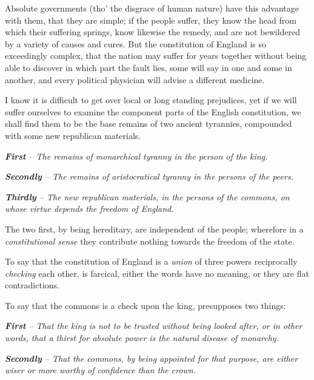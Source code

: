 \documentclass[12pt, twocolumn]{book}
\begin{document}
    Absolute governments (tho’ the disgrace of human nature) have this advantage with them, that they are simple; if the people suffer, they know the head from which their suffering springs, know likewise the remedy, and are not bewildered by a variety of causes and cures. But the constitution of England is so exceedingly complex, that the nation may suffer for years together without being able to discover in which part the fault lies, some will say in one and some in another, and every political physician will advise a different medicine.

    I know it is difficult to get over local or long standing prejudices, yet if we will suffer ourselves to examine the component parts of the English constitution, we shall find them to be the base remains of two ancient tyrannies, compounded with some new republican materials.

    \bigskip
    
    {\begin{adjustwidth}{0.5em}{0.5em} \small

        \centering \textit{\textbf{First} -- The remains of monarchical tyranny in the person of the king.}

        \medskip

        \textit{\textbf{Secondly} -- The remains of aristocratical tyranny in the persons of the peers.}

        \medskip

        \textit{\textbf{Thirdly} -- The new republican materials, in the persons of the commons, on whose virtue depends the freedom of England.}
    \end{adjustwidth}}

    \bigskip

    The two first, by being hereditary, are independent of the people; wherefore in a \textit{constitutional sense} they contribute nothing towards the freedom of the state.

    To say that the constitution of England is a \textit{union} of three powers reciprocally \textit{checking} each other, is farcical, either the words have no meaning, or they are flat contradictions.

    To say that the commons is a check upon the king, presupposes two things:

    \bigskip

    {\begin{adjustwidth}{0.5em}{0.5em} \small

        \centering \textit{\textbf{First} -- That the king is not to be trusted without being looked after, or in other words, that a thirst for absolute power is the natural disease of monarchy.}

        \medskip

        \textit{\textbf{Secondly} -- That the commons, by being appointed for that purpose, are either wiser or more worthy of confidence than the crown.}

    \end{adjustwidth}}
\end{document}
